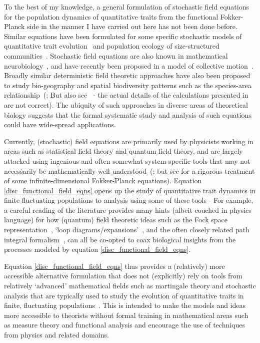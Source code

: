 To the best of my knowledge, a general formulation of stochastic field equations for the population dynamics of quantitative traits from the functional Fokker-Planck side in the manner I have carried out here has not been done before. Similar equations have been formulated for some specific stochastic models of quantitative trait evolution~\citep{rogers_demographic_2012,rogers_modes_2015} and population ecology of size-structured communities~\citep{odwyer_integrative_2009}. Stochastic field equations are also known in mathematical neurobiology~\citep{buice_field-theoretic_2007,bressloff_stochastic_2010,coombes_neural_2014}, and have recently been proposed in a model of collective motion~\citep{o_laighleis_minimal_2018}. Broadly similar deterministic field theoretic approaches have also been proposed to study bio-geography and spatial biodiversity patterns such as the species-area relationship~(\cite{odwyer_field_2010}; But also see~\cite{grilli_absence_2012} - the actual details of the calculations presented in~\cite{odwyer_field_2010} are not correct). The ubiquity of such approaches in diverse areas of theoretical biology suggests that the formal systematic study and analysis of such equations could have wide-spread applications.

Currently, (stochastic) field equations are primarily used by physicists working in areas such as statistical field theory and quantum field theory, and are largely attacked using ingenious and often somewhat system-specific tools that may not necessarily be mathematically well understood~(\cite{carmona_stochastic_1999}; but see \cite{bogachev_fokker-planck-kolmogorov_2015} for a rigorous treatment of some infinite-dimensional Fokker-Planck equations). Equation \eqref{disc_functional_field_eqns} opens up the study of quantitative trait dynamics in finite fluctuating populations to analysis using some of these tools - For example, a careful reading of the literature provides many hints (albeit couched in physics language) for how (quantum) field theoretic ideas such as the Fock space representation~\citep{del_razo_probabilistic_2022}, `loop diagrams/expansions'~\citep{hochberg_effective_1999,dodd_many-body_2009}, and the often closely related path integral formalism~\citep{doi_second_1976, peliti_path_1985,hochberg_effective_1999, chow_path_2015, weber_master_2017}, can all be co-opted to coax biological insights from the processes modeled by equation \eqref{disc_functional_field_eqns}.

Equation \eqref{disc_functional_field_eqns} thus provides a (relatively) more accessible alternative formulation that does not (explicitly) rely on tools from relatively `advanced' mathematical fields such as martingale theory and stochastic analysis that are typically used to study the evolution of quantitative traits in finite, fluctuating populations~\citep{dawson_stochastic_1975,fleming_measure-valued_1979,ethier_markov_1986,champagnat_unifying_2006,etheridge_mathematical_2011,week_white_2021}. This is intended to make the models and ideas more accessible to theorists without formal training in mathematical areas such as measure theory and functional analysis and encourage the use of techniques from physics and related domains.

